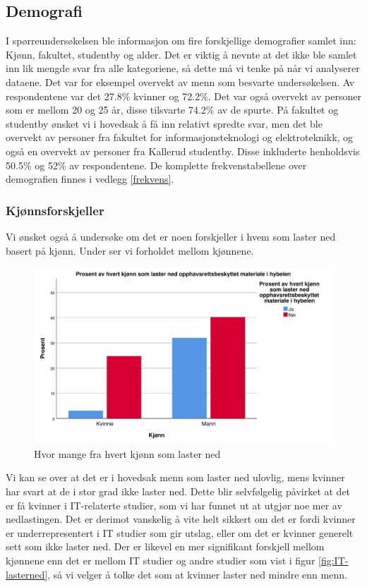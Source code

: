 \subsection{Demografi}
I spørreundersøkelsen ble informasjon om fire forskjellige demografier samlet inn: Kjønn, fakultet, studentby og alder. Det er viktig å nevnte at det ikke ble samlet inn lik mengde svar fra alle kategoriene, så dette må vi tenke på når vi analyserer dataene. Det var for eksempel overvekt av menn som besvarte undersøkelsen. Av respondentene var det 27.8\% kvinner og 72.2\%. Det var også overvekt av personer som er mellom 20 og 25 år, disse tilsvarte 74.2\% av de spurte. På fakultet og studentby ønsket vi i hovedsak å få inn relativt spredte svar, men det ble overvekt av personer fra fakultet for informasjonsteknologi og elektroteknikk, og også en overvekt av personer fra Kallerud studentby. Disse inkluderte henholdsvis 50.5\% og 52\% av respondentene. De komplette frekvenstabellene over demografien finnes i vedlegg \ref{frekvens}. 

\subsubsection{Kjønnsforskjeller}
Vi ønsket også å undersøke om det er noen forskjeller i hvem som laster ned basert på kjønn. Under ser vi forholdet mellom kjønnene.
\begin{figure}[H]
    \centering
    \includegraphics[scale=0.45]{case_1/bilder/kjonn_lasterned.pdf}
    \caption[Kjønn laster ned]{Hvor mange fra hvert kjønn som laster ned}
    \label{fig:case1-kjønn_lasterned}
\end{figure}
Vi kan se over at det er i hovedsak menn som laster ned ulovlig, mens kvinner har svart at de i stor grad ikke laster ned. Dette blir selvfølgelig påvirket at det er få kvinner i IT-relaterte studier, som vi har funnet ut at utgjør noe mer av nedlastingen. Det er derimot vanskelig å vite helt sikkert om det er fordi kvinner er underrepresentert i IT studier som gir utslag, eller om det er kvinner generelt sett som ikke laster ned. Der er likevel en mer signifikant forskjell mellom kjønnene enn det er mellom IT studier og andre studier som vist i figur \ref{fig:IT-lasterned}, så vi velger å tolke det som at kvinner laster ned mindre enn menn.


